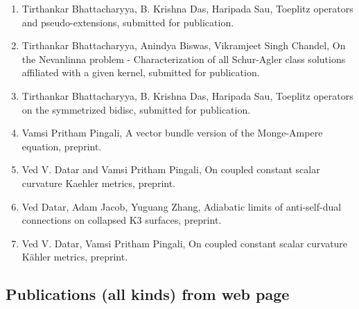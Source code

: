 \begin{enumerate}
\item Tirthankar Bhattacharyya, B. Krishna Das, Haripada Sau, Toeplitz operators and pseudo-extensions, submitted for publication.
\item Tirthankar Bhattacharyya, Anindya Biswas, Vikramjeet Singh Chandel, On the Nevanlinna problem - Characterization of all Schur-Agler class solutions affiliated with a given kernel, submitted for publication.
\item Tirthankar Bhattacharyya, B. Krishna Das, Haripada Sau, Toeplitz operators on the symmetrized bidisc, submitted for publication.
\item Vamsi Pritham Pingali, A vector bundle version of the Monge-Ampere equation, preprint.
\item Ved V. Datar and Vamsi Pritham Pingali, On coupled constant scalar curvature Kaehler metrics, preprint.
\item Ved Datar, Adam Jacob, Yuguang Zhang, Adiabatic limits of anti-self-dual connections on collapsed K3 surfaces, preprint.
\item Ved V. Datar, Vamsi Pritham Pingali, On coupled constant scalar curvature K\"ahler metrics, preprint.
\end{enumerate}


\subsection{Publications (all kinds) from web page}

